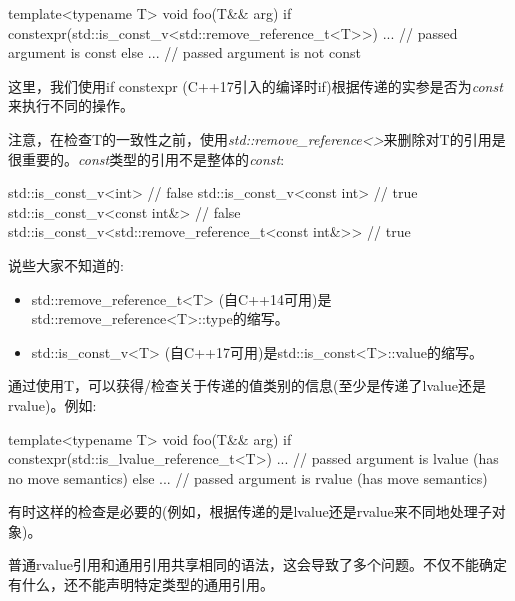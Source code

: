 \begin{codebox}[cpp]
template<typename T>
void foo(T&& arg)
{
  if constexpr(std::is_const_v<std::remove_reference_t<T>>) {
    ... // passed argument is const
  }
  else {
    ... // passed argument is not const
  }
}
\end{codebox}

这里，我们使用if constexpr (C++17引入的编译时if)根据传递的实参是否为\textit{const}来执行不同的操作。\par

注意，在检查T的一致性之前，使用\textit{std::\allowbreak{}remove\_\allowbreak{}reference<\allowbreak{}>}来删除对T的引用是很重要的。\textit{const}类型的引用不是整体的\textit{const}:\par

\begin{codebox}[cpp]
std::is_const_v<int> // false
std::is_const_v<const int> // true
std::is_const_v<const int&> // false
std::is_const_v<std::remove_reference_t<const int&>> // true
\end{codebox}

说些大家不知道的:\par

\begin{itemize}
  \item std::remove\_reference\_t<T> (自C++14可用)是std::remove\_reference<T>::type的缩写。
  \item std::is\_const\_v<T> (自C++17可用)是std::is\_const<T>::value的缩写。
\end{itemize}


通过使用T，可以获得/检查关于传递的值类别的信息(至少是传递了lvalue还是rvalue)。例如:\par

\begin{codebox}[cpp]
template<typename T>
void foo(T&& arg)
{
  if constexpr(std::is_lvalue_reference_t<T>) {
    ... // passed argument is lvalue (has no move semantics)
  }
  else {
    ... // passed argument is rvalue (has move semantics)
  }
}
\end{codebox}

有时这样的检查是必要的(例如，根据传递的是lvalue还是rvalue来不同地处理子对象)。\par


普通rvalue引用和通用引用共享相同的语法，这会导致了多个问题。不仅不能确定有什么，还不能声明特定类型的通用引用。\par


